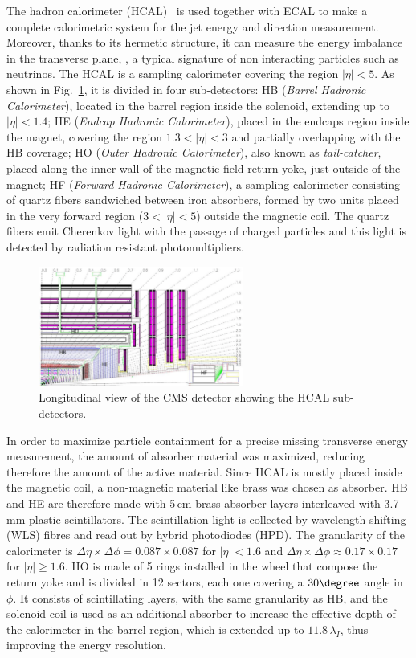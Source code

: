 The hadron calorimeter (HCAL)~\cite{hcal} is used together with ECAL to make a complete calorimetric system for the jet energy and direction measurement. Moreover, thanks to its hermetic structure, it can measure the energy imbalance in the transverse plane, \MET, a typical signature of non interacting particles such as neutrinos. The HCAL is a sampling calorimeter covering the region $|\eta|<5$. As shown in Fig.~\ref{fig:hcal}, it is divided in four sub-detectors: HB (\emph{Barrel Hadronic Calorimeter}), located in the barrel region inside the solenoid, extending up to $|\eta|<1.4$; HE (\emph{Endcap Hadronic Calorimeter}), placed in the endcaps region inside the magnet, covering the region $1.3 < |\eta| < 3$ and partially overlapping with the HB coverage; HO (\emph{Outer Hadronic Calorimeter}), also known as \emph{tail-catcher}, placed along the inner wall of the magnetic field return yoke, just outside of the magnet; HF (\emph{Forward Hadronic Calorimeter}), a sampling calorimeter consisting of quartz fibers sandwiched between iron absorbers,
formed by two units placed in the very forward region ($3<|\eta|<5$) outside the magnetic coil. The quartz fibers emit Cherenkov light with the passage of charged particles and this light is detected by radiation resistant photomultipliers.
\begin{figure}[htb]
\centering
\includegraphics[width=0.6\textwidth]{images/hcal.png}
\caption{Longitudinal view of the CMS detector showing the HCAL sub-detectors.}\label{fig:hcal}
\end{figure}
In order to maximize particle containment for a precise missing transverse energy measurement, the amount of absorber material was maximized, reducing therefore the amount of the active material. Since HCAL is mostly placed inside the magnetic coil, a non-magnetic material like brass was chosen as absorber. HB and HE are therefore made with 5\,cm brass absorber layers interleaved with 3.7\,mm plastic scintillators. The scintillation light is collected by wavelength shifting (WLS) fibres and read out by hybrid photodiodes (HPD). The granularity of the calorimeter is $\Delta\eta\times\Delta\phi = 0.087 \times 0.087$ for $|\eta|<1.6$ and $\Delta\eta\times\Delta\phi \approx 0.17 \times 0.17$ for $|\eta|\geq1.6$. HO is made of 5 rings installed in the wheel that compose the return yoke and is divided in 12 sectors, each one covering a $30\degree$ angle in $\phi$. It consists of scintillating layers, with the same granularity as HB, and the solenoid coil is used as an additional absorber to increase the effective depth of the calorimeter in the barrel region, which is extended up to $11.8\,\lambda_I$, thus improving the energy resolution.

